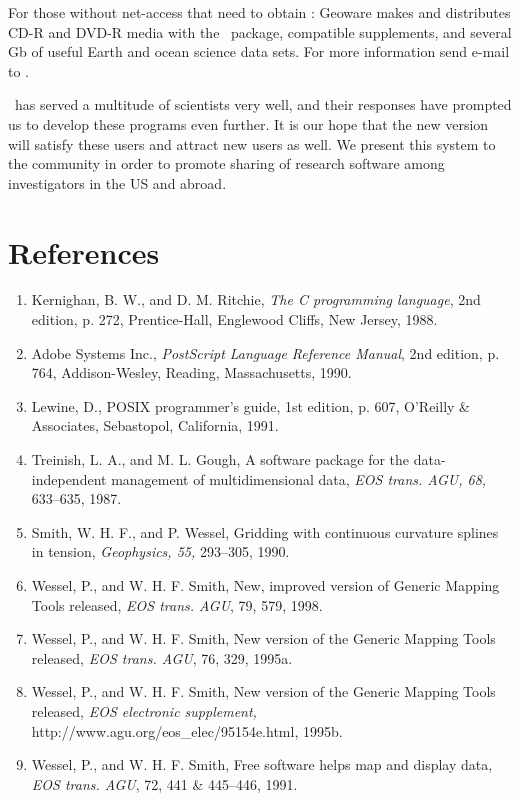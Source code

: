 For those without net-access that need to obtain \GMT: Geoware
makes and distributes CD-R and DVD-R media with the \GMT\ package, compatible supplements, and
several Gb of useful Earth and ocean science data sets.  For more information send e-mail to
. 

\GMT\ has served a multitude of scientists very well, and their responses
have prompted us to develop these programs even further.  It is our
hope that the new version will satisfy these users and attract new
users as well.  We present this system to the community in order to
promote sharing of research software among investigators in the US
and abroad. 

\section*{References}

\begin{enumerate}
\item Kernighan, B. W., and D. M. Ritchie, {\it The C programming language},
2nd edition, p. 272, Prentice-Hall, Englewood Cliffs, New Jersey, 1988.

\item Adobe Systems Inc., {\it PostScript Language Reference Manual},
2nd edition, p. 764, Addison-Wesley, Reading, Massachusetts, 1990.

\item Lewine, D., POSIX programmer's guide, 1st edition, p. 607, O'Reilly
\& Associates, Sebastopol, California, 1991. 

\item Treinish, L. A., and M. L. Gough, A software package for the
data-independent management of multidimensional data,
{\it EOS trans. AGU, 68, }633--635, 1987.

\item Smith, W. H. F., and P. Wessel, Gridding with continuous curvature
splines in tension, {\it Geophysics, 55, }293--305, 1990. 

\item Wessel, P., and W. H. F. Smith, New, improved version of Generic
Mapping Tools released, {\it EOS trans. AGU}, 79, 579, 1998. 

\item Wessel, P., and W. H. F. Smith, New version of the Generic
Mapping Tools released, {\it EOS trans. AGU}, 76, 329, 1995a. 

\item Wessel, P., and W. H. F. Smith, New version of the Generic
Mapping Tools released, {\it EOS electronic supplement, }
http://www.agu.org/eos\_elec/95154e.html, 1995b. 

\item Wessel, P., and W. H. F. Smith, Free software helps map and
display data, {\it EOS trans. AGU}, 72, 441 \& 445--446, 1991. 

\end{enumerate}
